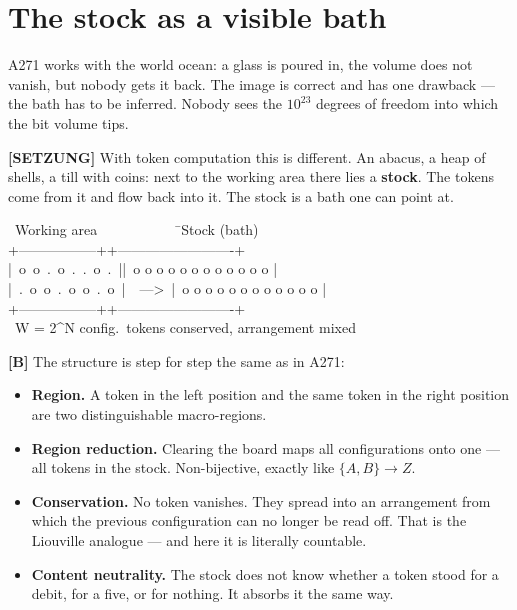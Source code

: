 \section{The stock as a visible bath}

A271 works with the world ocean: a glass is poured in, the volume does not vanish,
but nobody gets it back. The image is correct and has one drawback --- the bath
has to be inferred. Nobody sees the $10^{23}$ degrees of freedom into which the
bit volume tips.

\textbf{[SETZUNG]} With token computation this is different. An abacus, a heap of shells, a till
with coins: next to the working area there lies a \textbf{stock}. The tokens come
from it and flow back into it. The stock is a bath one can point at.

\begin{center}
\begin{minipage}{0.95\textwidth}
\ttfamily\scriptsize
\begin{tabbing}
\ Working area\ \ \ \ \ \ \ \ \ \ \ \=\ Stock (bath)\\[0.3em]
+-----------------+\>+-------------------------+\\
|\ o\ o\ .\ o\ .\ .\ o\ .\ |\>|\ o o o o o o o o o o o o |\\
|\ .\ o\ o\ .\ o\ o\ .\ o\ |\ \ ---\textgreater\ \>|\ o o o o o o o o o o o o |\\
+-----------------+\>+-------------------------+\\
\ W = 2\^{}N config.\>\ tokens conserved, arrangement mixed
\end{tabbing}
\end{minipage}
\end{center}

\textbf{[B]} The structure is step for step the same as in A271:

\begin{itemize}[leftmargin=1.4em,itemsep=0.3em]
  \item \textbf{Region.} A token in the left position and the same token in the
        right position are two distinguishable macro-regions.
  \item \textbf{Region reduction.} Clearing the board maps all configurations onto
        one --- all tokens in the stock. Non-bijective, exactly like
        $\{A,B\}\to Z$.
  \item \textbf{Conservation.} No token vanishes. They spread into an arrangement
        from which the previous configuration can no longer be read off. That is
        the Liouville analogue --- and here it is literally countable.
  \item \textbf{Content neutrality.} The stock does not know whether a token stood
        for a debit, for a five, or for nothing. It absorbs it the same way.
\end{itemize}

